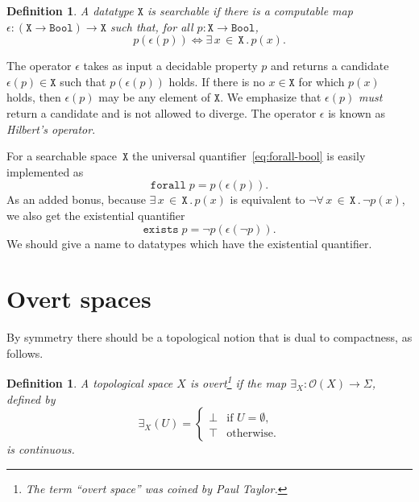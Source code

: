 \documentclass[a4paper,10pt]{article}
\newtheorem{definition}[theorem]{Definition}
\newcommand{\tpl}[1]{\mathcal{O}(#1)}
\newcommand{\Bool}{\mathtt{Bool}}
\newcommand{\xall}[3]{\forall\, #1 \,{\in}\, #2\,.\,#3}
\newcommand{\xsome}[3]{\exists\, #1 \,{\in}\, #2\,.\,#3}
\begin{document}
\begin{definition}
  A datatype $\mathtt{X}$ is \emph{searchable} if there is a
  computable map $\epsilon : (\mathtt{X} \to \Bool) \to \mathtt{X}$
  such that, for all $p : \mathtt{X} \to \Bool$,
  \begin{equation*}
    p (\epsilon(p)) \iff \xsome{x}{\mathtt{X}}{p(x)}.
  \end{equation*}
\end{definition}

The operator $\epsilon$ takes as input a decidable property $p$ and
returns a candidate $\epsilon(p) \in \mathtt{X}$ such that
$p(\epsilon(p))$ holds. If there is no $x \in \mathtt{X}$ for which
$p(x)$ holds, then $\epsilon(p)$ may be any element of $\mathtt{X}$.
We emphasize that $\epsilon(p)$ \emph{must} return a candidate and is
not allowed to diverge. The operator $\epsilon$ is known as
\emph{Hilbert's operator}.

For a searchable space~$\mathtt{X}$ the universal
quantifier~\eqref{eq:forall-bool} is easily implemented as
%
\begin{equation*}
  \mathtt{forall} \; p = p (\epsilon(p)).
\end{equation*}
%
As an added bonus, because $\xsome{x}{\mathtt{X}}{p(x)}$ is equivalent
to $\lnot\xall{x}{\mathtt{X}}{\lnot p(x)}$, we also get the
existential quantifier
%
\begin{equation*}
  \mathtt{exists} \; p = \lnot p(\epsilon (\lnot p)).
\end{equation*}
%
We should give a name to datatypes which have the existential
quantifier.

\section{Overt spaces}
\label{sec:overt-spaces}

By symmetry there should be a topological notion that is dual to
compactness, as follows.

\begin{definition}
  A topological space $X$ is \emph{overt}\footnote{The term ``overt
    space'' was coined by Paul Taylor.} if the map $\exists_X :
  \tpl{X} \to \Sigma$, defined by
  \begin{equation*}
    \exists_X (U) =
    \begin{cases}
      \bot & \text{if $U = \emptyset$,}\\
      \top & \text{otherwise.}
    \end{cases}
  \end{equation*}
  is continuous.
\end{definition}
\end{document}
